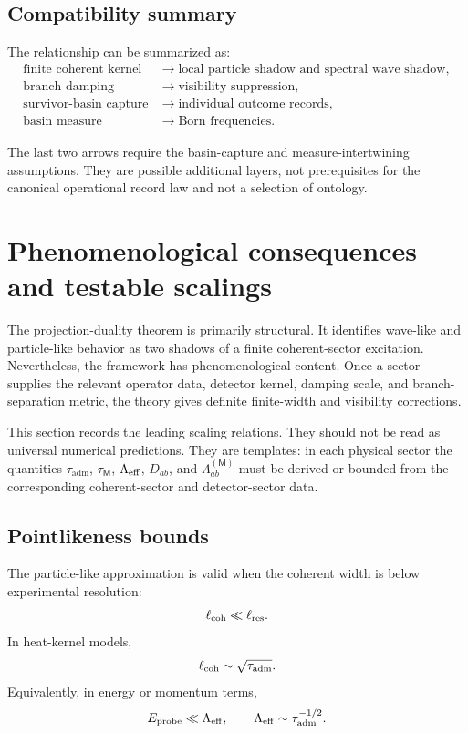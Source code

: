 \documentclass[11pt]{article}
\newcommand{\ta}{\tau_{\mathrm{adm}}}
\newcommand{\Meas}{\mathsf M}
\begin{document}
\subsection{Compatibility summary}
\label{subsec:compatibility-summary}

The relationship can be summarized as:
\begin{align}
  \text{finite coherent kernel}
  &\longrightarrow
  \text{local particle shadow and spectral wave shadow},
  \\
  \text{branch damping}
  &\longrightarrow
  \text{visibility suppression},
  \\
  \text{survivor-basin capture}
  &\longrightarrow
  \text{individual outcome records},
  \\
  \text{basin measure}
  &\longrightarrow
  \text{Born frequencies}.
\end{align}

The last two arrows require the basin-capture and measure-intertwining assumptions.
They are possible additional layers, not prerequisites for the canonical operational
record law and not a selection of ontology.
\section{Phenomenological consequences and testable scalings}
\label{sec:phenomenological-consequences}

The projection-duality theorem is primarily structural. It identifies wave-like and particle-like
behavior as two shadows of a finite coherent-sector excitation. Nevertheless, the framework
has phenomenological content. Once a sector supplies the relevant operator data, detector
kernel, damping scale, and branch-separation metric, the theory gives definite finite-width and
visibility corrections.

This section records the leading scaling relations. They should not be read as universal
numerical predictions. They are templates: in each physical sector the quantities
\(\ta\), \(\tau_{\Meas}\), \(\Lambda_{\rm eff}\), \(D_{ab}\), and \(\Lambda_{ab}^{(\Meas)}\) must be derived or
bounded from the corresponding coherent-sector and detector-sector data.

\subsection{Pointlikeness bounds}
\label{subsec:pointlikeness-bounds}

The particle-like approximation is valid when the coherent width is below experimental
resolution:
\begin{equation}
  \ell_{\rm coh}\ll \ell_{\rm res}.
  \label{eq:phen-pointlike-length}
\end{equation}
In heat-kernel models,
\begin{equation}
  \ell_{\rm coh}\sim \sqrt{\ta}.
\end{equation}
Equivalently, in energy or momentum terms,
\begin{equation}
  E_{\rm probe}\ll \Lambda_{\rm eff},
  \qquad
  \Lambda_{\rm eff}\sim\ta^{-1/2}.
  \label{eq:phen-pointlike-energy}
\end{equation}
\end{document}
